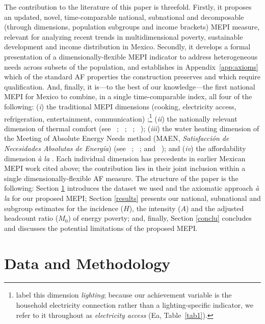 \documentclass[11pt, a4paper]{article}
\newcommand{\citealp}[1]{\citeauthor{#1}~\citeyear{#1}}
\begin{document}
The contribution to the literature of this paper is threefold. Firstly, it proposes an updated, novel, time-comparable national, subnational and decomposable (through dimensions, population subgroups and income brackets) MEPI measure, relevant for analyzing recent trends in multidimensional poverty, sustainable development and income distribution in Mexico. Secondly, it develops a formal presentation of a dimensionally-flexible MEPI indicator to address heterogeneous needs across subsets of the population, and establishes in Appendix~\ref{app:axioms} which of the standard AF properties the construction preserves and which require qualification. And, finally, it is---to the best of our knowledge---the first national MEPI for Mexico to combine, in a single time-comparable index, all four of the following: (\textit{i}) the traditional MEPI dimensions (cooking, electricity access, refrigeration, entertainment, communication) \parencite{nussbaumer2012};\footnote{\textcite{nussbaumer2012} label this dimension \textit{lighting}; because our achievement variable is the household electricity connection rather than a lighting-specific indicator, we refer to it throughout as \textit{electricity access} (Ea, Table~\ref{tab1}).} (\textit{ii}) the nationally relevant dimension of thermal comfort (see \citealp{canto-franco2026}; \citealp{cedano2021}; \citealp{jimeneztorres2026}; \citealp{robles-bonilla2021}); (\textit{iii}) the water heating dimension of the Meeting of Absolute Energy Needs method (MAEN, \textit{Satisfacción de Necesidades Absolutas de Energía}) (see \citealp{zotero-item-1006}; \citealp{garciaochoa2016}; and \citealp{garcia-ochoa2016}); and (\textit{iv}) the affordability dimension \textit{à la} \textcite{hills2011, hills2012}. Each individual dimension has precedents in earlier Mexican MEPI work cited above; the contribution lies in their joint inclusion within a single dimensionally-flexible AF measure. The structure of the paper is the following: Section \ref{data} introduces the dataset we used and the axiomatic approach\textit{ à la} \textcite{alkire2015} for our proposed MEPI; Section \ref{results} presents our national, subnational and subgroup estimates for the incidence ($H$), the intensity ($A$) and the adjusted headcount ratio ($M_0$) of energy poverty; and, finally, Section \ref{conclu} concludes and discusses the potential limitations of the proposed MEPI.

\section{Data and Methodology}\label{data}
\end{document}
